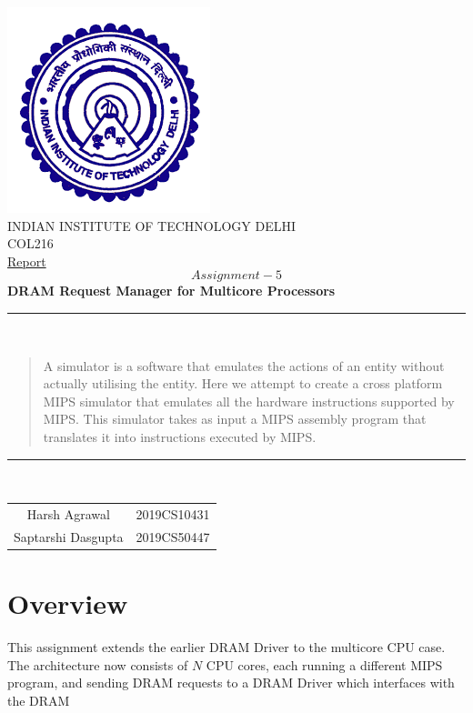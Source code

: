 \documentclass[hidelinks,12pt]{article}
\begin{document}
\begin{titlepage}
    \centering
    \includegraphics[scale=0.5]{../../logo.png}\\[1.0cm]
    \Large INDIAN INSTITUTE OF TECHNOLOGY DELHI\\[1.0 cm]
    \LARGE COL216\\[0.1cm]
    \Large \underline{Report}\\
    \large \[Assignment-5\]
    \LARGE \textbf{DRAM Request Manager for Multicore Processors}


    \rule{\textwidth}{0.2 mm} \\[0.1cm]
    \begin{abstract}
        A simulator is a software that emulates the actions of an entity without actually utilising the entity.
        Here we attempt to create a cross platform MIPS simulator that emulates all the hardware instructions supported by MIPS.
        This simulator takes as input a MIPS assembly program that translates it into instructions executed by MIPS.
        \\[0.1cm]
    \end{abstract}
    \rule{\textwidth}{0.2 mm} \\[0.1cm]
    \begin{flushright}

        \begin{tabular}{c|c}
            \small {Harsh Agrawal}      & \small {2019CS10431} \\
            \small {Saptarshi Dasgupta} & \small {2019CS50447} \\
        \end{tabular}
    \end{flushright}
\end{titlepage}
\tableofcontents
\newpage
\section{Overview}
This assignment extends the earlier DRAM Driver to the multicore CPU
case. The architecture now consists of $N$ CPU cores, each running a different MIPS program,
and sending DRAM requests to a DRAM Driver which interfaces with the DRAM
\end{document}
